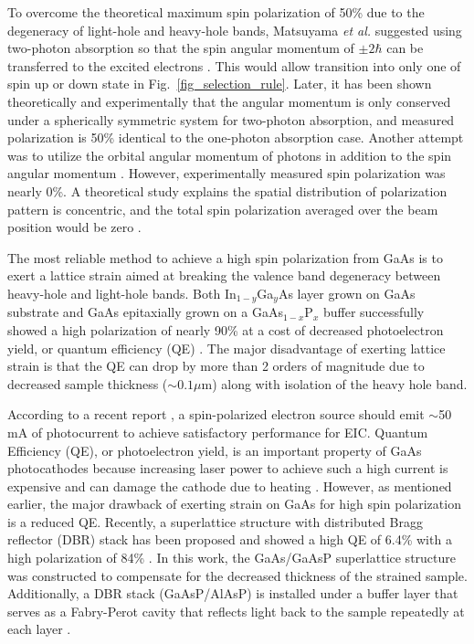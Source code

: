 To overcome the theoretical maximum spin polarization of 50\% due to the degeneracy of light-hole and heavy-hole bands, Matsuyama \emph{et al.} suggested using two-photon absorption so that the spin angular momentum of $\pm2 \hbar$ can be transferred to the excited electrons \cite{matsuyama2001spin}. This would allow transition into only one of spin up or down state in Fig.~\ref{fig_selection_rule}. Later, it has been shown theoretically \cite{bhat2005two} and experimentally \cite{mccarter2014_MeasurementElectronBeam} that the angular momentum is only conserved under a spherically symmetric system for two-photon absorption, and measured polarization is 50\% identical to the one-photon absorption case. Another attempt was to utilize the orbital angular momentum of photons in addition to the spin angular momentum \cite{clayburn2013}. However, experimentally measured spin polarization was nearly 0\%. A theoretical study explains the spatial distribution of polarization pattern is concentric, and the total spin polarization averaged over the beam position would be zero \cite{solyanik2019spin}.

The most reliable method to achieve a high spin polarization from GaAs is to exert a lattice strain aimed at breaking the valence band degeneracy between heavy-hole and light-hole bands. Both In$_{1-y}$Ga$_y$As layer grown on GaAs substrate and GaAs epitaxially grown on a GaAs$_{1-x}$P$_x$ buffer successfully showed a high polarization of nearly 90\% at a cost of decreased photoelectron yield, or quantum efficiency (QE) \cite{maruyama1992_ElectronspinPolarizationPhotoemission}.
The major disadvantage of exerting lattice strain is that the QE can drop by more than 2 orders of magnitude due to decreased sample thickness ($\sim 0.1 \mu $m) along with isolation of the heavy hole band.

According to a recent report \cite{NASreport}, a spin-polarized electron source should emit $\sim$50 mA of photocurrent to achieve satisfactory performance for EIC. Quantum Efficiency (QE), or photoelectron yield, is an important property of GaAs photocathodes because increasing laser power to achieve such a high current is expensive and can damage the cathode due to heating \cite{peng2019optical}. However, as mentioned earlier, the major drawback of exerting strain on GaAs for high spin polarization is a reduced QE. Recently, a superlattice structure with distributed Bragg reflector (DBR) stack has been proposed and showed a high QE of 6.4\% with a high polarization of 84\% \cite{liu2016_RecordlevelQuantumEfficiency}. In this work, the GaAs/GaAsP superlattice structure was constructed to compensate for the decreased thickness of the strained sample. Additionally, a DBR stack (GaAsP/AlAsP) is installed under a buffer layer that serves as a Fabry-Perot cavity that reflects light back to the sample repeatedly at each layer \cite{liu2016_RecordlevelQuantumEfficiency}.


